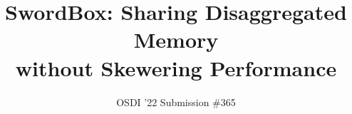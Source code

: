 \documentclass[10pt,twocolumn]{article}
\newcommand{\sword}{SwordBox}
\begin{document}

\title{\sword: Sharing Disaggregated Memory\\ without Skewering Performance}

\author{OSDI '22 Submission \#365}
\date{}

\maketitle













\balance
\vspace{-0.3cm}
{\footnotesize 
}
\vspace{-0.5cm}
\end{document}
